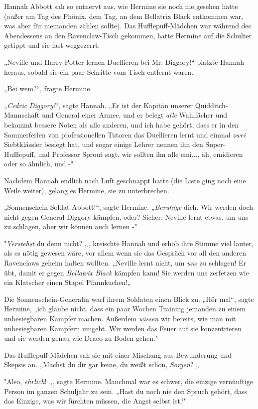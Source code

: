 {Hannah Abbott sah so entnervt aus, wie Hermine sie noch nie gesehen hatte (außer am Tag des Phönix, dem Tag, an dem Bellatrix Black entkommen war, was aber für niemanden zählen sollte). Das Hufflepuff-Mädchen war während des Abendessens an den Ravenclaw-Tisch gekommen, hatte Hermine auf die Schulter getippt und sie fast weggezerrt.

„Neville und Harry Potter lernen Duellieren bei Mr. Diggory!“ platzte Hannah heraus, sobald sie ein paar Schritte vom Tisch entfernt waren.

„Bei wem?“, fragte Hermine.

„\emph{Cedric} \emph{Diggory!}“, sagte Hannah. „Er ist der Kapitän unserer Quidditch-Mannschaft und General einer Armee, und er belegt \emph{alle} Wahlfächer und bekommt bessere Noten als alle anderen, und ich habe gehört, dass er in den Sommerferien von professionellen Tutoren das Duellieren lernt und einmal \emph{zwei} Siebtklässler besiegt hat, und sogar einige Lehrer nennen ihn den Super-Hufflepuff, und Professor Sprout sagt, wir sollten ihn alle emi..., äh, emidieren oder so ähnlich, und -"

Nachdem Hannah endlich nach Luft geschnappt hatte (die Liste ging noch eine Weile weiter), gelang es Hermine, sie zu unterbrechen.

„Sonnenschein-Soldat Abbott!“, sagte Hermine. „\emph{Beruhige} dich. Wir werden doch nicht gegen General Diggory kämpfen, oder? Sicher, Neville lernt etwas, um uns zu schlagen, aber wir können auch lernen -"

"\emph{Verstehst} du denn nicht? „, kreischte Hannah und erhob ihre Stimme viel lauter, als es nötig gewesen wäre, vor allem wenn sie das Gespräch vor all den anderen Ravenclaws geheim halten wollten. „Neville lernt nicht, um \emph{uns} zu schlagen! Er übt, damit er gegen \emph{Bellatrix Black} kämpfen kann! Sie werden uns zerfetzen wie ein Klatscher einen Stapel Pfannkuchen!„

Die Sonnenschein-Generalin warf ihrem Soldaten einen Blick zu. „Hör mal“, sagte Hermine, „ich glaube nicht, dass ein paar Wochen Training jemanden zu einem unbesiegbaren Kämpfer machen. Außerdem \emph{wissen} wir bereits, wie man mit unbesiegbaren Kämpfern umgeht. Wir werden das Feuer auf sie konzentrieren und sie werden genau wie Draco zu Boden gehen."

Das Hufflepuff-Mädchen sah sie mit einer Mischung aus Bewunderung und Skepsis an. „Machst du dir gar keine, du weißt schon, \emph{Sorgen}? „

"Also, \emph{ehrlich}! „, sagte Hermine. Manchmal war es schwer, die einzige vernünftige Person im ganzen Schuljahr zu sein. „Hast du noch nie den Spruch gehört, dass das Einzige, was wir fürchten müssen, die Angst selbst ist?"

}
